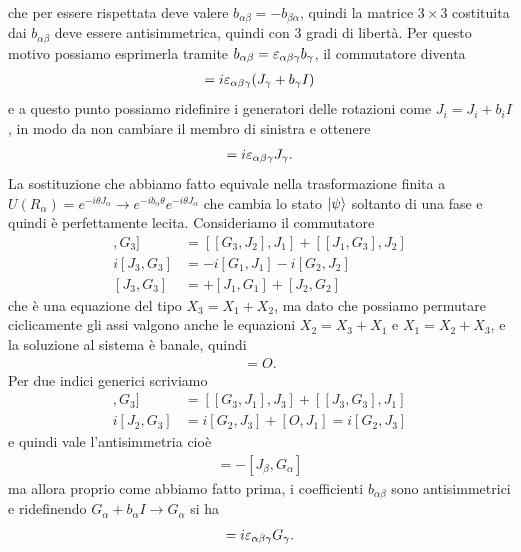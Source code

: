 che per essere rispettata deve valere $ b_{\alpha \beta} = - b_{\beta \alpha} $, quindi la matrice $ 3\times3 $ costituita dai $ b_{\alpha \beta} $ 
deve essere antisimmetrica, quindi con $ 3 $ gradi di libertà. Per questo motivo possiamo esprimerla tramite 
$ b_{\alpha \beta} = \varepsilon_{\alpha \beta \gamma} b_\gamma $, il commutatore diventa 
\begin{align*}
  [J_\alpha, J_\beta] = i \eps_{\alpha \beta \gamma} (J_\gamma + b_\gamma I)
\end{align*}
e a questo punto possiamo ridefinire i generatori delle rotazioni come $ J_i = J_i + b_i I $, in modo da non cambiare il membro di sinistra 
e ottenere 
\begin{align*}
  [J_\alpha, J_\beta] = i \eps_{\alpha \beta \gamma} J_\gamma.
\end{align*}
La sostituzione che abbiamo fatto equivale nella trasformazione finita a 
$ U(R_\alpha) = e^{- i \theta J_\alpha} \to e^{-i b_\alpha \theta} e^{- i \theta J_\alpha} $ che cambia lo stato $ \vert \psi \rangle $ soltanto di una fase e quindi 
è perfettamente lecita. 
Consideriamo il commutatore 
\begin{align*}
  [[J_1, J_2], G_3] &= [[G_3, J_2], J_1]  + [[J_1, G_3], J_2]
  \\
  i[J_3, G_3] &= -i [G_1, J_1] -i [G_2, J_2]
  \\
  [J_3, G_3] &= +[J_1, G_1] +[J_2, G_2]
\end{align*}
che è una equazione del tipo $ X_3 = X_1 + X_2 $, ma dato che possiamo permutare ciclicamente gli assi valgono anche le equazioni $ X_2 = X_3 + X_1 $ e 
$ X_1 = X_2 + X_3 $, e la soluzione al sistema è banale, quindi 
\begin{align*}
  [J_\alpha, G_\alpha] = O.
\end{align*}
Per due indici generici scriviamo 
\begin{align*}
  [[J_3, J_1], G_3] &= [[G_3, J_1], J_3]  + [[J_3, G_3], J_1]
  \\
  i[J_2, G_3] &= i[G_2, J_3] + [O, J_1] = i[G_2, J_3]
\end{align*}
e quindi vale l'antisimmetria cioè
\begin{align*}
  [J_\alpha, G_\beta] = - [J_\beta,G_\alpha]
\end{align*}
ma allora proprio come abbiamo fatto prima, i coefficienti $ b_{\alpha \beta} $ sono antisimmetrici e ridefinendo $ G_\alpha + b_\alpha I \to G_\alpha $ 
si ha
\begin{align*}
  [J_\alpha, G_\beta] = i \eps_{\alpha \beta \gamma} G_\gamma.
\end{align*}
